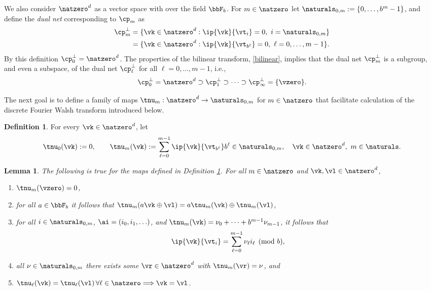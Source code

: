\documentclass[]{elsarticle}
\newtheorem{lem}{Lemma}
\theoremstyle{definition}
\newtheorem{defin}{Definition}
\renewcommand{\bbK}{\natzero^d}
\newcommand{\natm}{\naturals_{0,m}}
\begin{document}
We also consider $\bbK$ as a vector space with over the field $\bbF_b$.  For $m \in \natzero$ let $\natm:=\{0, \ldots, b^{m}-1\}$, and define the \emph{dual net} corresponding to $\cp_m$ as  
\begin{align*}
\cp^{\perp}_m &= \{\vk \in \bbK : \ip{\vk}{\vt_i} = 0, \ i=\natm\} \\
&= \{\vk \in \bbK : \ip{\vk}{\vt_{b^{\ell}}} = 0, \ \ell=0, \ldots, m-1\}.
\end{align*}
By this definition $\cp^{\perp}_{0}=\bbK$.  The properties of the bilinear transform, \eqref{bilinear}, implies that the dual net $\cp^{\perp}_m$ is a subgroup, and even a subspace, of the dual net $\cp^{\perp}_\ell$ for all $\ell=0, \ldots, m-1$, i.e., 
\[
\cp_0^{\perp}=\natzero^d \supset \cp_1^{\perp}  \supset \cdots \supset \cp_{\infty}^{\perp} =\{\vzero\}.
\]

The next goal is to define a family of maps $\tnu_m : \bbK \to \natm$ for $m \in \natzero$ that facilitate calculation of the discrete Fourier Walsh transform introduced below. 

\begin{defin} \label{numapdef} For every $\vk \in \bbK$, let 
\begin{equation} \label{numapdefeq}
\tnu_0(\vk) := 0, \qquad \tnu_m(\vk) := \sum_{\ell=0}^{m-1} \ip{\vk}{\vt_{b^\ell}} b^{\ell} \in \natm, \quad \vk \in \natzero^d,\ m \in \naturals.
\end{equation}
\end{defin}

\begin{lem} \label{numaplem} The following is true for the maps defined in Definition \ref{numapdef}.  For all $m \in \natzero$ and $\vk, \vl \in \bbK$,
\begin{enumerate}
\renewcommand{\labelenumi}{\alph{enumi})}

\item $\tnu_m(\vzero) = 0$,

\item for all $a \in \bbF_b$ it follows that $\tnu_m(a\vk \oplus \vl)=a\tnu_m(\vk) \oplus \tnu_m(\vl)$,

\item for all $i \in \natm$, $\ai=(i_0, i_1, \ldots)$, and $\tnu_m(\vk)=\nu_0 + \cdots + b^{m-1} \nu_{m-1}$, it follows that 
\begin{equation} \label{nuwisum}
\ip{\vk}{\vt_i} = \sum_{\ell=0}^{m-1} \nu_\ell i_{\ell} \pmod b,
\end{equation}

\item all $\nu \in \natm$ there exists some $\vr \in \bbK$ with $\tnu_m(\vr)=\nu$, and

\item $\tnu_\ell(\vk)=\tnu_\ell(\vl) \, \forall \ell \in \natzero \Longrightarrow \vk = \vl$.

\end{enumerate}
\end{lem}
\end{document}

